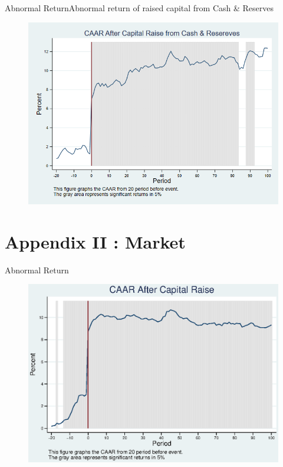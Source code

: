 \documentclass{beamer}
\begin{document}
\begin{frame}{Abnormal Return}{Abnormal return of raised capital from Cash \& Reserves}
\label{abreturnhybridWithoutAlpha}
\begin{figure}
\centering
\includegraphics[width=0.65\linewidth]{AbReturnHybrid_WithoutAlpha}
\label{fig:abreturnhybrid3}
\end{figure}
\hfill\hyperlink{abreturnhybrid}{}
\end{frame}



\section{Appendix II : Market}
\begin{frame}{Abnormal Return}
\label{abreturnMarket}
\begin{figure}
\centering
\includegraphics[width=0.7\linewidth]{AbReturn_Market.eps}
\label{fig:abreturn4}
\end{figure}
\hfill\hyperlink{abreturn}{}
\end{frame}
\end{document}
